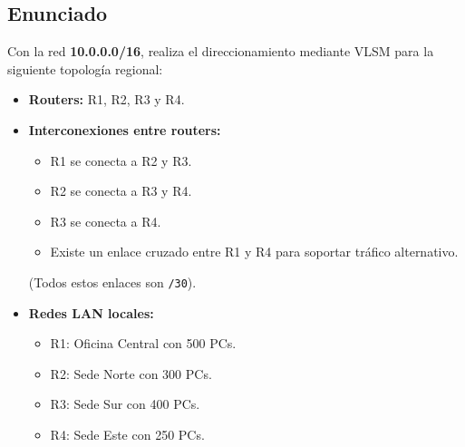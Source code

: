 \documentclass[a4paper,12pt]{article}
\begin{document}
\subsection{Enunciado}
Con la red \textbf{10.0.0.0/16}, realiza el direccionamiento mediante VLSM para la siguiente topología regional:
\begin{itemize}
  \item \textbf{Routers:} R1, R2, R3 y R4.
  \item \textbf{Interconexiones entre routers:}
    \begin{itemize}
      \item R1 se conecta a R2 y R3.
      \item R2 se conecta a R3 y R4.
      \item R3 se conecta a R4.
      \item Existe un enlace cruzado entre R1 y R4 para soportar tráfico alternativo.
    \end{itemize}
    (Todos estos enlaces son \texttt{/30}).
  \item \textbf{Redes LAN locales:}
    \begin{itemize}
      \item R1: Oficina Central con 500 PCs.
      \item R2: Sede Norte con 300 PCs.
      \item R3: Sede Sur con 400 PCs.
      \item R4: Sede Este con 250 PCs.
    \end{itemize}
\end{itemize}
\end{document}
